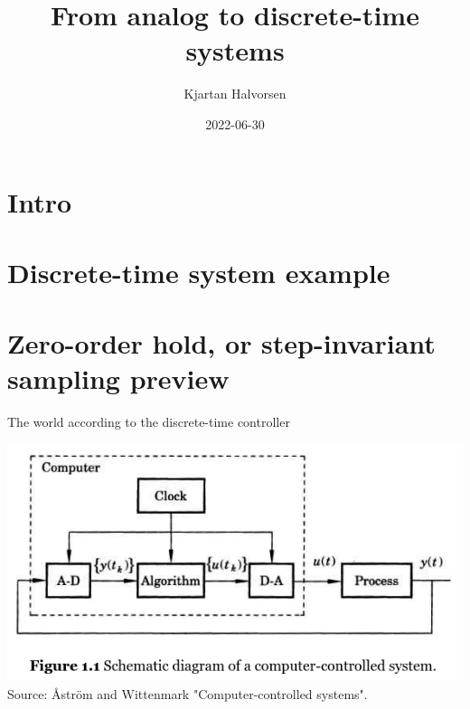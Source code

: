 \documentclass[presentation,aspectratio=169]{beamer}
\author{Kjartan Halvorsen}
\date{2022-06-30}
\title{From analog to discrete-time systems}
\begin{document}
\maketitle

\section{Intro}
\label{sec:org72215e0}


\section{Discrete-time system example}
\label{sec:org2998baa}

\section{Zero-order hold, or step-invariant sampling preview}
\label{sec:orge96f1c7}

\begin{frame}[label={sec:org7315fe8}]{The world according to the discrete-time controller}
\begin{center}
\includegraphics[width=0.6\linewidth]{../../figures/fig1-1-schematic.png} Source: Åström and Wittenmark "Computer-controlled systems".
\end{center}
\end{frame}
\end{document}
